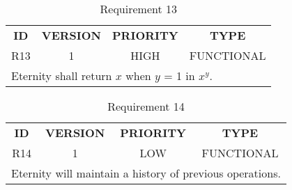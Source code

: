 \documentclass[11pt,a4paper]{report}
\theoremstyle{definition}
\theoremstyle{remark}
\begin{document}
            \begin{table}[ht]
            \centering
                \begin{tabular}{cccc} %
                    \textbf{ID} & \textbf{VERSION} & \textbf{PRIORITY} & \textbf{TYPE}\\
                            R13  &           1      &           HIGH    &      FUNCTIONAL\\
                    \hline
                    \multicolumn{4}{l}{Eternity shall return $x$ when $y$ = 1 in $x^y$.}
                \end{tabular}
                \caption{Requirement 13}
                \label{tab:table-requirements-13}
            \end{table}
            \vspace{3em}
            
            \begin{table}[ht]
            \centering
                \begin{tabular}{cccc} %
                    \textbf{ID} & \textbf{VERSION} & \textbf{PRIORITY} & \textbf{TYPE}\\
                            R14  &           1      &           LOW    &      FUNCTIONAL\\
                    \hline
                    \multicolumn{4}{l}{Eternity will maintain a history of previous operations.}
                \end{tabular}
                \caption{Requirement 14}
                \label{tab:table-requirements-14}
            \end{table}
            \vspace{3em}
\end{document}
